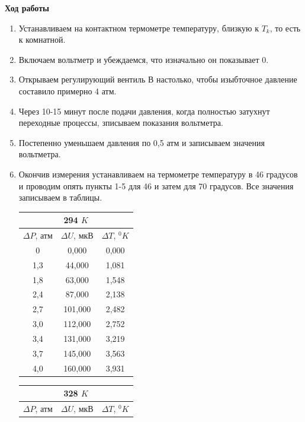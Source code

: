 \documentclass[a4paper, 12pt]{article}%
\begin{document}
	\textbf{Ход работы}
	\begin{enumerate}
	\item Устанавливаем на контактном термометре температуру, близкую к $T_k$, то есть к комнатной.
	\item Включаем вольтметр и убеждаемся, что изначально он показывает 0. 
	\item Открываем регулирующий вентиль В настолько, чтобы изыбточное давление составило примерно 4 атм.
	\item Через 10-15 минут после подачи давления, когда полностью затухнут переходные процессы, зписываем показания вольтметра. 
	\item Постепенно уменьшаем давления по 0,5 атм и записываем значения вольтметра.
	\item Окончив измерения устанавливаем на термометре температуру в 46 градусов и проводим опять пункты 1-5 для 46 и затем для 70 градусов. Все значения записываем в таблицы.
	\begin{center}
\begin{tabular}{|c|c|c|}
\hline
\multicolumn{3}{|c|}{294 $K$}                             \\ \hline
$\Delta P$, атм & $\Delta U$, мкВ & $\Delta T$, $^{0}K$ \\ \hline
0               & 0,000           & 0,000               \\ \hline
1,3             & 44,000          & 1,081               \\ \hline
1,8             & 63,000          & 1,548               \\ \hline
2,4             & 87,000          & 2,138               \\ \hline
2,7             & 101,000         & 2,482               \\ \hline
3,0             & 112,000         & 2,752               \\ \hline
3,4             & 131,000         & 3,219               \\ \hline
3,7             & 145,000         & 3,563               \\ \hline
4,0             & 160,000         & 3,931               \\ \hline
\end{tabular}
\begin{tabular}{|c|c|c|}
\hline
\multicolumn{3}{|c|}{328 $K$}                         \\ \hline
$\Delta P$, атм & $\Delta U$, мкВ & $\Delta T$, $^0K$ \\ \hline

\end{tabular}
\end{center}
\end{enumerate}
\end{document}
